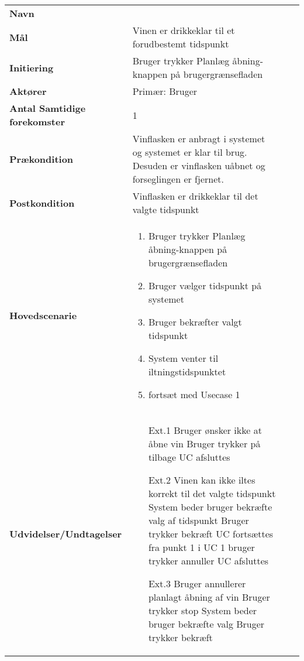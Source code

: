\begin{longtable}{>{\bfseries}TX TX}
	
	Navn & \bfseries{} \\
	Mål & Vinen er drikkeklar til et forudbestemt tidspunkt\\
	Initiering & Bruger trykker Planlæg åbning-knappen på brugergrænsefladen\\
	Aktører & Primær: Bruger \\
	Antal Samtidige forekomster & 1 \\
	Prækondition & Vinflasken er anbragt i systemet og systemet er klar til brug. Desuden er vinflasken uåbnet og forseglingen er fjernet. \\
	Postkondition & Vinflasken er drikkeklar til det valgte tidspunkt\\
	Hovedscenarie & \begin{enumerate}
		\item Bruger trykker Planlæg åbning-knappen på brugergrænsefladen	
		\item Bruger vælger tidspunkt på systemet
		\item Bruger bekræfter valgt tidspunkt
		\item System venter til iltningstidspunktet
		\item fortsæt med Usecase 1	
	\end{enumerate} \\
	Udvidelser/Undtagelser & \begin{enumerate}
		\item[Ext.1] Bruger ønsker ikke at åbne vin
		\subitem[1.1a] Bruger trykker på tilbage
		\subitem[1.2b] UC afsluttes
		\item[Ext.2] Vinen kan ikke iltes korrekt til det valgte tidspunkt
		\subitem[2.1] System beder bruger bekræfte valg af tidspunkt
		\subitem[2.2a] Bruger trykker bekræft
		\subitem[2.3a] UC fortsættes fra punkt 1 i UC 1
		\subitem[2.2b] bruger trykker annuller
		\subitem[2.3b] UC afsluttes
		\item[Ext.3] Bruger annullerer planlagt åbning af vin
		\subitem[3.1] Bruger trykker stop
		\subitem[3.2] System beder bruger bekræfte valg
		\subitem[3.3] Bruger trykker bekræft
	\end{enumerate}
\end{longtable}